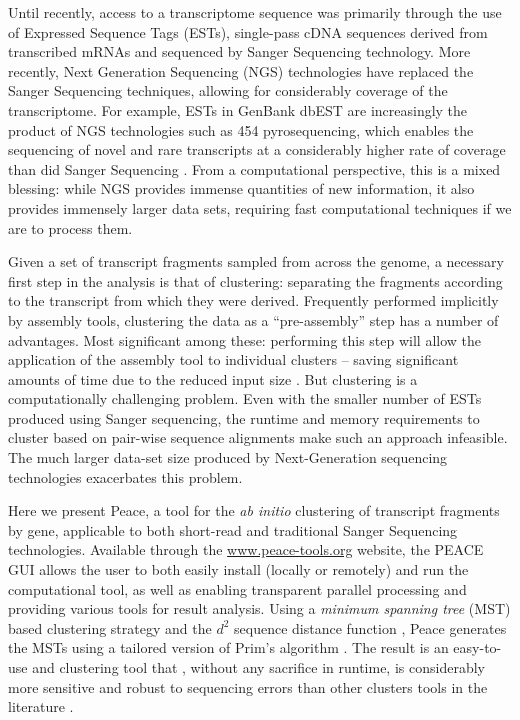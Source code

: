 \documentclass[a4,center,fleqn]{NAR}
\begin{document}
Until recently, access to a transcriptome sequence was primarily
through the use of Expressed Sequence Tags (ESTs), single-pass cDNA
sequences derived from transcribed mRNAs and sequenced by Sanger
Sequencing technology.  More recently, Next Generation Sequencing
(NGS) technologies have replaced the Sanger Sequencing techniques,
allowing for considerably coverage of the transcriptome.  For example,
ESTs in GenBank dbEST are increasingly the product of NGS technologies
such as 454 pyrosequencing, which enables the sequencing of novel and
rare transcripts at a considerably higher rate of coverage than did
Sanger Sequencing \cite{Cheung2006,Emrich2007}.  From a computational
perspective, this is a mixed blessing: while NGS provides immense
quantities of new information, it also provides immensely larger data
sets, requiring fast computational techniques if we are to process
them.

Given a set of transcript fragments sampled from across the genome, a
necessary first step in the analysis is that of clustering: separating
the fragments according to the transcript from which they were
derived.  Frequently performed implicitly by assembly tools,
clustering the data as a ``pre-assembly'' step has a number of
advantages.  Most significant among these: performing this step will
allow the application of the assembly tool to individual clusters --
saving significant amounts of time due to the reduced input size
\cite{Hazelhurst08a}.  But clustering is a computationally challenging
problem.  Even with the smaller number of ESTs produced using Sanger
sequencing, the runtime and memory requirements to cluster based on
pair-wise sequence alignments make such an approach infeasible.  The
much larger data-set size produced by Next-Generation sequencing
technologies exacerbates this problem.

Here we present {\sc Peace}, a tool for the {\it ab initio} clustering
of transcript fragments by gene, applicable to both short-read and
traditional Sanger Sequencing technologies.  Available through the
\href{http://www.peace-tools.org}{www.peace-tools.org} website, the
PEACE GUI allows the user to both easily install (locally or remotely)
and run the computational tool, as well as enabling transparent
parallel processing and providing various tools for result analysis.
Using a {\it minimum spanning tree} (MST) based clustering strategy
\cite{Jain99,Wan08} and the $d^2$ sequence distance function
\cite{Hide94}, {\sc Peace} generates the MSTs using a tailored version
of Prim's algorithm \cite{Prim57}.  The result is an easy-to-use and
clustering tool that , without any sacrifice in runtime, is
considerably more sensitive and robust to sequencing errors than other
clusters tools in the literature \cite{Burke99,Slater00,
  Huang99,Parkinson02,Kalyanaraman03,Malde03,Ptitsyn05,Hazelhurst08a, Picardi09}.
\end{document}
